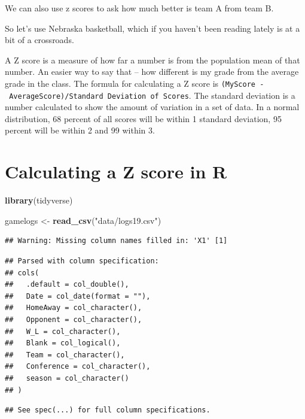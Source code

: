 \documentclass[]{book}
\newenvironment{Shaded}{\begin{snugshade}}{\end{snugshade}}
\newcommand{\KeywordTok}[1]{\textcolor[rgb]{0.13,0.29,0.53}{\textbf{#1}}}
\newcommand{\StringTok}[1]{\textcolor[rgb]{0.31,0.60,0.02}{#1}}
\newcommand{\NormalTok}[1]{#1}
\begin{document}
We can also use z scores to ask how much better is team A from team B.

So let's use Nebraska basketball, which if you haven't been reading
lately is at a bit of a crossroads.

A Z score is a measure of how far a number is from the population mean
of that number. An easier way to say that -- how different is my grade
from the average grade in the class. The formula for calculating a Z
score is
\texttt{(MyScore\ -\ AverageScore)/Standard\ Deviation\ of\ Scores}. The
standard deviation is a number calculated to show the amount of
variation in a set of data. In a normal distribution, 68 percent of all
scores will be within 1 standard deviation, 95 percent will be within 2
and 99 within 3.

\section{Calculating a Z score in R}\label{calculating-a-z-score-in-r}

\begin{Shaded}
\begin{Highlighting}[]
\KeywordTok{library}\NormalTok{(tidyverse)}
\end{Highlighting}
\end{Shaded}

\begin{Shaded}
\begin{Highlighting}[]
\NormalTok{gamelogs <-}\StringTok{ }\KeywordTok{read_csv}\NormalTok{(}\StringTok{"data/logs19.csv"}\NormalTok{)}
\end{Highlighting}
\end{Shaded}

\begin{verbatim}
## Warning: Missing column names filled in: 'X1' [1]
\end{verbatim}

\begin{verbatim}
## Parsed with column specification:
## cols(
##   .default = col_double(),
##   Date = col_date(format = ""),
##   HomeAway = col_character(),
##   Opponent = col_character(),
##   W_L = col_character(),
##   Blank = col_logical(),
##   Team = col_character(),
##   Conference = col_character(),
##   season = col_character()
## )
\end{verbatim}

\begin{verbatim}
## See spec(...) for full column specifications.
\end{verbatim}
\end{document}
